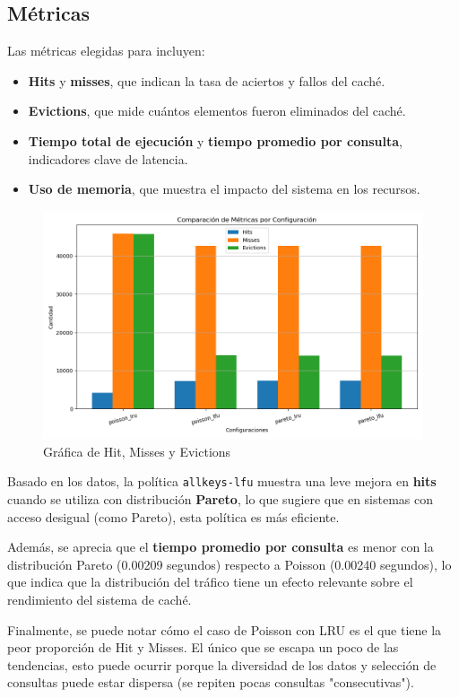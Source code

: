 \documentclass[12pt]{udpreport}
\begin{document}
\subsection{Métricas}
Las métricas elegidas para incluyen:
\begin{itemize}
    \item \textbf{Hits} y \textbf{misses}, que indican la tasa de aciertos y fallos del caché.
    \item \textbf{Evictions}, que mide cuántos elementos fueron eliminados del caché.
    \item \textbf{Tiempo total de ejecución} y \textbf{tiempo promedio por consulta}, indicadores clave de latencia.
    \item \textbf{Uso de memoria}, que muestra el impacto del sistema en los recursos.
\end{itemize}

\begin{figure}[h]
    \centering
    \includegraphics[width=12cm]{images/metricas_comparadas.png}
    \caption{Gráfica de Hit, Misses y Evictions}
\end{figure}

Basado en los datos, la política \texttt{allkeys-lfu} muestra una leve mejora en \textbf{hits} cuando se utiliza con distribución \textbf{Pareto}, lo que sugiere que en sistemas con acceso desigual (como Pareto), esta política es más eficiente.

Además, se aprecia que el \textbf{tiempo promedio por consulta} es menor con la distribución Pareto (0.00209 segundos) respecto a Poisson (0.00240 segundos), lo que indica que la distribución del tráfico tiene un efecto relevante sobre el rendimiento del sistema de caché.

Finalmente, se puede notar cómo el caso de Poisson con LRU es el que tiene la peor proporción de Hit y Misses. El único que se escapa un poco de las tendencias, esto puede ocurrir porque la diversidad de los datos y selección de consultas puede estar dispersa (se repiten pocas consultas "consecutivas").
\end{document}
